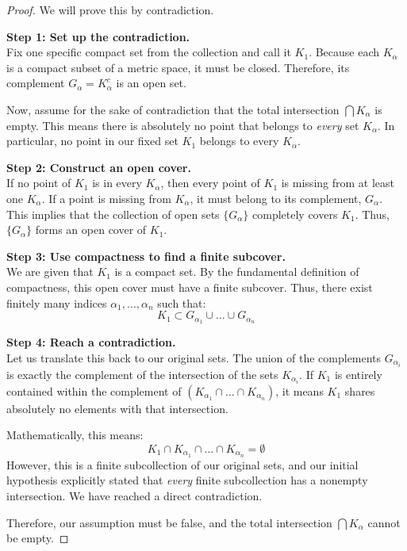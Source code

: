 \documentclass{article}
\theoremstyle{mythm}
\begin{document}
\begin{proof}
We will prove this by contradiction. 

\textbf{Step 1: Set up the contradiction.} \\
Fix one specific compact set from the collection and call it $K_1$. 
Because each $K_\alpha$ is a compact subset of a metric space, it must be closed. Therefore, its complement $G_\alpha = K_\alpha^c$ is an open set.

Now, assume for the sake of contradiction that the total intersection $\bigcap K_\alpha$ is empty. This means there is absolutely no point that belongs to \textit{every} set $K_\alpha$. In particular, no point in our fixed set $K_1$ belongs to every $K_\alpha$.

\textbf{Step 2: Construct an open cover.} \\
If no point of $K_1$ is in every $K_\alpha$, then every point of $K_1$ is missing from at least one $K_\alpha$. If a point is missing from $K_\alpha$, it must belong to its complement, $G_\alpha$. 
This implies that the collection of open sets $\{G_\alpha\}$ completely covers $K_1$. Thus, $\{G_\alpha\}$ forms an open cover of $K_1$.

\textbf{Step 3: Use compactness to find a finite subcover.} \\
We are given that $K_1$ is a compact set. By the fundamental definition of compactness, this open cover must have a finite subcover. Thus, there exist finitely many indices $\alpha_1, \dots, \alpha_n$ such that:
\[ K_1 \subset G_{\alpha_1} \cup \dots \cup G_{\alpha_n} \]

\textbf{Step 4: Reach a contradiction.} \\
Let us translate this back to our original sets. The union of the complements $G_{\alpha_i}$ is exactly the complement of the intersection of the sets $K_{\alpha_i}$. 
If $K_1$ is entirely contained within the complement of $(K_{\alpha_1} \cap \dots \cap K_{\alpha_n})$, it means $K_1$ shares absolutely no elements with that intersection. 

Mathematically, this means:
\[ K_1 \cap K_{\alpha_1} \cap \dots \cap K_{\alpha_n} = \emptyset \]
However, this is a finite subcollection of our original sets, and our initial hypothesis explicitly stated that \textit{every} finite subcollection has a nonempty intersection. We have reached a direct contradiction. 

Therefore, our assumption must be false, and the total intersection $\bigcap K_\alpha$ cannot be empty.
\end{proof}
\end{document}
